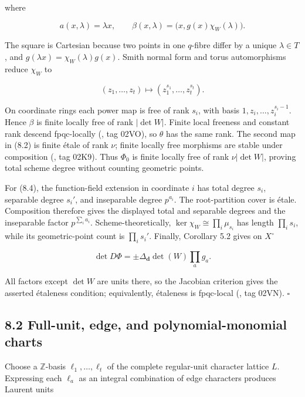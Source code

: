 \documentclass[
  11pt,
  a4paper,
]{article}
\begin{document}
where

\[
 a(x,\lambda)=\lambda x,
 \qquad
 \beta(x,\lambda)=\bigl(x,g(x)\chi_W(\lambda)\bigr).
\]

The square is Cartesian because two points in one \(q\)-fibre differ by
a unique \(\lambda\in T\), and \(g(\lambda x)=\chi_W(\lambda)g(x)\).
Smith normal form and torus automorphisms reduce \(\chi_W\) to

\[
 (z_1,\ldots,z_t)\longmapsto(z_1^{s_1},\ldots,z_t^{s_t}).
\tag{8.4}
\]

On coordinate rings each power map is free of rank \(s_i\), with basis
\(1,z_i,\ldots,z_i^{s_i-1}\). Hence \(\beta\) is finite locally free of
rank \(|\det W|\). Finite local freeness and constant rank descend
fpqc-locally (, tag 02VO), so \(\theta\) has the same rank. The second
map in (8.2) is finite étale of rank \(\nu\); finite locally free
morphisms are stable under composition
(, tag
02K9). Thus \(\Phi_0\) is finite locally free of rank \(\nu|\det W|\),
proving total scheme degree without counting geometric points.

For (8.4), the function-field extension in coordinate \(i\) has total
degree \(s_i\), separable degree \(s_i'\), and inseparable degree
\(p^{a_i}\). The root-partition cover is étale. Composition therefore
gives the displayed total and separable degrees and the inseparable
factor \(p^{\sum_i a_i}\). Scheme-theoretically,
\(\ker\chi_W\cong\prod_i\mu_{s_i}\) has length \(\prod_i s_i\), while
its geometric-point count is \(\prod_i s_i'\). Finally, Corollary 5.2
gives on \(X^\circ\)

\[
 \det D\Phi
 =\pm\Delta_{\mathbf d}\det(W)\prod_ag_a.
\]

All factors except \(\det W\) are units there, so the Jacobian criterion
gives the asserted étaleness condition; equivalently, étaleness is
fpqc-local (, tag 02VN). \(\square\)

\subsection{8.2 Full-unit, edge, and polynomial-monomial
charts}\label{full-unit-edge-and-polynomial-monomial-charts}

Choose a \(\mathbb Z\)-basis \(\ell_1,\ldots,\ell_t\) of the complete
regular-unit character lattice \(L\). Expressing each \(\ell_a\) as an
integral combination of edge characters produces Laurent units
\end{document}
